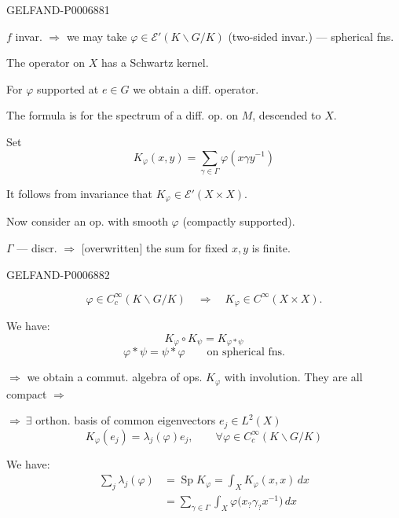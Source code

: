 \begin{GelfandAdjacentEvidence}{GELFAND-P000688}{1}

\(f\) invar. \(\Rightarrow\) we may take
\(\varphi\in\mathcal E'(K\backslash G/K)\)
(two-sided invar.) --- spherical fns.

The operator on \(X\) has a Schwartz kernel.

For \(\varphi\) supported at \(e\in G\) we obtain a diff. operator.

The formula is for the spectrum of a diff. op. on \(M\), descended to \(X\).

Set
\[
K_\varphi(x,y)=\sum_{\gamma\in\Gamma}\varphi(x\gamma y^{-1})
\]

It follows from invariance that \(K_\varphi\in\mathcal E'(X\times X)\).

Now consider an op. with smooth \(\varphi\) (compactly supported).

\(\Gamma\) --- discr. \(\Rightarrow\) [overwritten] the sum for fixed \(x,y\) is finite.
\end{GelfandAdjacentEvidence}
\begin{GelfandAdjacentEvidence}{GELFAND-P000688}{2}

\[
\varphi\in C_c^\infty(K\backslash G/K)
\quad\Rightarrow\quad K_\varphi\in C^\infty(X\times X).
\]

We have:
\[
K_\varphi\circ K_\psi=K_{\varphi*\psi}
\]
\[
\varphi*\psi=\psi*\varphi\qquad\text{on spherical fns.}
\]

\(\Rightarrow\) we obtain a commut. algebra of ops. \(K_\varphi\) with involution.
They are all compact \(\Rightarrow\)

\(\Rightarrow\ \exists\) orthon. basis of common eigenvectors \(e_j\in L^2(X)\)
\[
K_\varphi(e_j)=\lambda_j(\varphi)e_j,\qquad
\forall\varphi\in C_c^\infty(K\backslash G/K)
\]

We have:
\[
\begin{aligned}
\sum_j\lambda_j(\varphi)
&=\operatorname{Sp}K_\varphi
 =\int_XK_\varphi(x,x)\,dx\\
&=\sum_{\gamma\in\Gamma}\int_X
 \varphi\bigl(x_{?}\gamma_{?}x^{-1}\bigr)\,dx
\end{aligned}
\]
\end{GelfandAdjacentEvidence}
